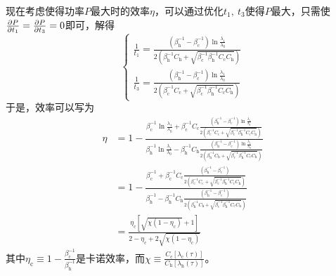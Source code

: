 现在考虑使得功率$P$最大时的效率$\eta$，可以通过优化$t_1,\ t_3$使得$P$最大，只需使$\frac{\partial P}{\partial t_1}=\frac{\partial P}{\partial t_3}=0$即可，解得
\begin{equation}
    \left\{\begin{aligned}
        \frac{1}{t_{1}}=\frac{\left(\beta_{\mathrm{h}}^{-1}-\beta_{\mathrm{c}}^{-1}\right) \ln \frac{\lambda_{1}}{\lambda_{0}}}{2\left(\beta_{\mathrm{h}}^{-1} C_{\mathrm{h}}+\sqrt{\beta_{\mathrm{c}}^{-1} \beta_{\mathrm{h}}^{-1} C_{\mathrm{c}} C_{\mathrm{h}}}\right)}\\
        \frac{1}{t_{3}}=\frac{\left(\beta_{\mathrm{h}}^{-1}-\beta_{\mathrm{c}}^{-1}\right) \ln \frac{\lambda_{1}}{\lambda_{0}}}{2\left(\beta_{\mathrm{c}}^{-1} C_{\mathrm{c}}+\sqrt{\beta_{\mathrm{c}}^{-1} \beta_{\mathrm{h}}^{-1} C_{\mathrm{c}} C_{\mathrm{h}}}\right)}
    \end{aligned}\right.
    \label{eq3.36}
\end{equation}
于是，效率可以写为
\begin{equation}
    \begin{split}
        \eta&=1- \frac{\beta_{\mathrm{c}}^{-1} \ln{\frac{\lambda_1}{\lambda_0}} + \beta_{\mathrm{c}}^{-1} C_{\mathrm{c}} \frac{\left(\beta_{\mathrm{h}}^{-1}-\beta_{\mathrm{c}}^{-1}\right) \ln \frac{\lambda_{1}}{\lambda_{0}}}{2\left(\beta_{\mathrm{c}}^{-1} C_{\mathrm{c}}+\sqrt{\beta_{\mathrm{c}}^{-1} \beta_{\mathrm{h}}^{-1} C_{\mathrm{c}} C_{\mathrm{h}}}\right)}}{\beta_{\mathrm{h}}^{-1} \ln{\frac{\lambda_1}{\lambda_0}} - \beta_{\mathrm{h}}^{-1} C_{\mathrm{h}} \frac{\left(\beta_{\mathrm{h}}^{-1}-\beta_{\mathrm{c}}^{-1}\right) \ln \frac{\lambda_{1}}{\lambda_{0}}}{2\left(\beta_{\mathrm{h}}^{-1} C_{\mathrm{h}}+\sqrt{\beta_{\mathrm{c}}^{-1} \beta_{\mathrm{h}}^{-1} C_{\mathrm{c}} C_{\mathrm{h}}}\right)}}\\
        &=1- \frac{\beta_{\mathrm{c}}^{-1}  + \beta_{\mathrm{c}}^{-1} C_{\mathrm{c}} \frac{\left(\beta_{\mathrm{h}}^{-1}-\beta_{\mathrm{c}}^{-1}\right) }{2\left(\beta_{\mathrm{c}}^{-1} C_{\mathrm{c}}+\sqrt{\beta_{\mathrm{c}}^{-1} \beta_{\mathrm{h}}^{-1} C_{\mathrm{c}} C_{\mathrm{h}}}\right)}}{\beta_{\mathrm{h}}^{-1}  - \beta_{\mathrm{h}}^{-1} C_{\mathrm{h}} \frac{\left(\beta_{\mathrm{h}}^{-1}-\beta_{\mathrm{c}}^{-1}\right) }{2\left(\beta_{\mathrm{h}}^{-1} C_{\mathrm{h}}+\sqrt{\beta_{\mathrm{c}}^{-1} \beta_{\mathrm{h}}^{-1} C_{\mathrm{c}} C_{\mathrm{h}}}\right)}}\\
        &=\frac{\eta_{\mathrm{c}}\left[\sqrt{\chi(1-\eta_{\mathrm{c}})}+1\right]}{2-\eta_{\mathrm{c}}+2 \sqrt{\chi\left(1-\eta_{\mathrm{c}}\right)}}
    \end{split}
    \label{eq3.37}
\end{equation}
其中$\eta_{\mathrm{c}}\equiv 1-\frac{\beta_{\mathrm{c}}^{-1}}{\beta_{\mathrm{h}}^{-1}}$是卡诺效率，而$\chi\equiv\frac{C_{\mathrm{c}} [\lambda_{\mathrm{c}}(\tau)]}{C_{\mathrm{h}} [\lambda_{\mathrm{h}}(\tau)]}$。

